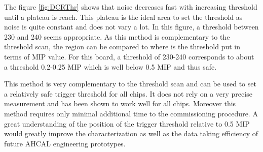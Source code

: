 The figure \ref{fig:DCRThr} shows that noise decreases fast with increasing threshold until a plateau is reach. This plateau is the ideal area to set the threshold as noise is quite constant and does not vary a lot. In this figure, a threshold between 230 and 240 seems appropriate. As this method is complementary to the threshold scan, the region can be compared to where is the threshold put in terms of MIP value. For this board, a threshold of 230-240 corresponds to about a threshold 0.2-0.25 MIP which is well below 0.5 MIP and thus safe.

This method is very complementary to the threshold scan and can be used to set a relatively safe trigger threshold for all chips. It does not rely on a very precise measurement and has been shown to work well for all chips. Moreover this method requires only minimal additional time to the commissioning procedure. A great understanding of the position of the trigger threshold relative to 0.5 MIP would greatly improve the characterization as well as the data taking efficiency of future AHCAL engineering prototypes.

